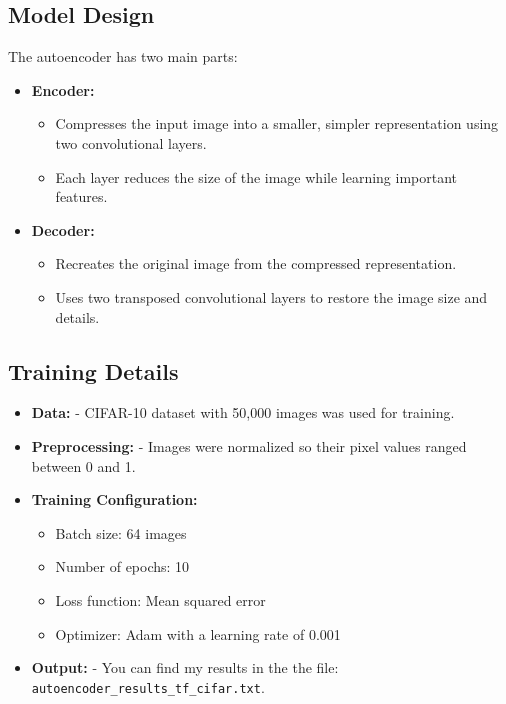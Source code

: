 \documentclass[lettersize,journal]{IEEEtran}
\begin{document}
\subsection{\textbf{Model Design}}
The autoencoder has two main parts:
\begin{itemize}
    \item \textbf{Encoder:} 
    \begin{itemize}
        \item Compresses the input image into a smaller, simpler representation using two convolutional layers.
        \item Each layer reduces the size of the image while learning important features.
    \end{itemize}
    \item \textbf{Decoder:} 
    \begin{itemize}
        \item Recreates the original image from the compressed representation.
        \item Uses two transposed convolutional layers to restore the image size and details.
    \end{itemize}
\end{itemize}

\subsection{\textbf{Training Details}}
\begin{itemize}
    \item \textbf{Data:} 
    - CIFAR-10 dataset with 50,000 images was used for training.
    \item \textbf{Preprocessing:} 
    - Images were normalized so their pixel values ranged between 0 and 1.
    \item \textbf{Training Configuration:}
    \begin{itemize}
        \item Batch size: 64 images
        \item Number of epochs: 10
        \item Loss function: Mean squared error
        \item Optimizer: Adam with a learning rate of 0.001
    \end{itemize}
    \item \textbf{Output:}
    - You can find my results in the the file:
    \texttt{autoencoder\_results\_tf\_cifar.txt}.
\end{itemize}
\end{document}
